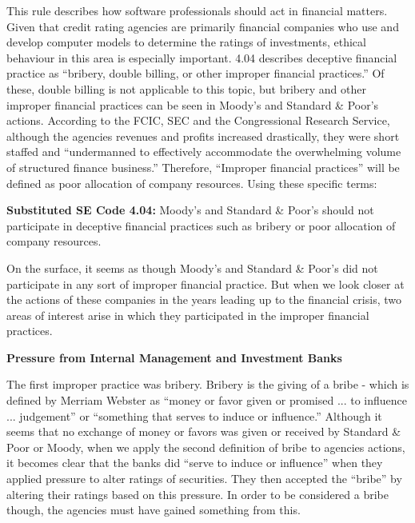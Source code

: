 \documentclass[11pt]{article}
\begin{document}
\begin{multicols}{2}
This rule describes how software professionals should act in financial matters.  Given that credit rating agencies are primarily financial companies who use and develop computer models to determine the ratings of investments, ethical behaviour in this area is especially important.  
4.04 describes deceptive financial practice as ``bribery, double billing, or other improper financial practices.''  Of these, double billing is not applicable to this topic, but bribery and other improper financial practices can be seen in Moody's and Standard \& Poor's actions.  According to the FCIC, SEC and the Congressional Research Service, although the agencies revenues and profits increased drastically, they were short staffed and ``undermanned to effectively accommodate the overwhelming volume of structured finance business.'' \cite[pg. 7]{CRS, govtReport, secCRAreport} Therefore, ``Improper financial practices'' will be defined as poor allocation of company resources.  
Using these specific terms:


\begin{framed}
\noindent
   \textbf{Substituted SE Code 4.04: } 
   \newline
   Moody's and Standard \& Poor's should not participate in deceptive financial practices such as bribery or poor allocation of company resources.
\end{framed}


On the surface, it seems as though Moody's and Standard \& Poor's did not participate in any sort of improper financial practice.  But when we look closer at the actions of these companies in the years leading up to the financial crisis, two areas of interest arise in which they participated in the improper financial practices.  

\textbf{Pressure from Internal Management and Investment Banks}

The first improper practice was bribery.  Bribery is the giving of a bribe - which is defined by Merriam Webster as ``money or favor given or promised ... to influence ... judgement'' or ``something that serves to induce or influence.'' \cite{bribeDef}  Although it seems that no exchange of money or favors was given or received by Standard \& Poor or Moody, when we apply the second definition of bribe to agencies actions, it becomes clear that the banks did ``serve to induce or influence'' when they applied pressure to alter ratings of securities.  They then accepted the ``bribe'' by altering their ratings based on this pressure.  In order to be considered a bribe though, the agencies must have gained something from this.


\end{multicols}
\end{document}
